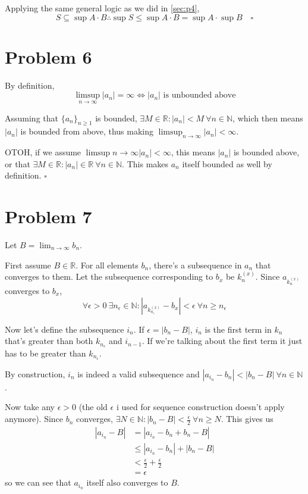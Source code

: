 \documentclass[12pt]{article}
\newcommand{\N}{\mathbb{N}}
\newcommand{\R}{\mathbb{R}}
\begin{document}
Applying the same general logic as we did in \ref{sec:p4},
\[S \subseteq \sup A \cdot B \therefore \sup S \le \sup A \cdot B = \sup A \cdot \sup B\quad\square\]

\pagebreak

\section{Problem 6}

By definition,
\[\limsup_{n \to \infty} |a_n|=\infty \iff \text{$|a_n|$ is unbounded above}\]

Assuming that $\{a_n\}_{n \ge 1}$ is bounded, $\exists M \in \R: |a_n| < M\ \forall n \in \N$,
which then means $|a_n|$ is bounded from above, thus making $\limsup_{n \to \infty} |a_n| < \infty$.

OTOH, if we assume $\limsup{n \to \infty} |a_n| < \infty$, this means $|a_n|$ is bounded above,
or that $\exists M \in \R: |a_n| \in \R\ \forall n \in \N$.
This makes $a_n$ itself bounded as well by definition. $\square$

\section{Problem 7}

Let $B=\lim_{n \to \infty} b_n$.

First assume $B \in \R$.
For all elements $b_n$, there's a subsequence in $a_n$ that converges to them.
Let the subsequence corresponding to $b_x$ be $k^{(x)}_n$.
Since $a_{k^{(x)}_n}$ converges to $b_x$,
\[\forall \epsilon > 0\ \exists n_\epsilon \in \N: \left|a_{k^{(x)}_{n_\epsilon}}-b_x\right| < \epsilon\ \forall n \ge n_\epsilon\]

Now let's define the subsequence $i_n$.
If $\epsilon=|b_n - B|$, $i_n$ is the first term in $k_n$
that's greater than both $k_{n_\epsilon}$ and $i_{n-1}$.
If we're talking about the first term it just has to be greater than $k_{n_\epsilon}$.

By construction, $i_n$ is indeed a valid subsequence and $|a_{i_n} - b_n| < |b_n - B|\ \forall n \in \N$.

Now take any $\epsilon > 0$ (the old $\epsilon$ i used for sequence construction doesn't apply anymore).
Since $b_n$ converges, $\exists N \in \N: |b_n-B| < \frac{\epsilon}{2}\ \forall n \ge N$.
This gives us
\begin{align*}
  |a_{i_n}-B|
   & = |a_{i_n} - b_n + b_n - B|               \\
   & \le |a_{i_n} - b_n| + |b_n - B|           \\
   & < \frac{\epsilon}{2} + \frac{\epsilon}{2} \\
   & = \epsilon
\end{align*}
so we can see that $a_{i_n}$ itself also converges to $B$.
\end{document}
